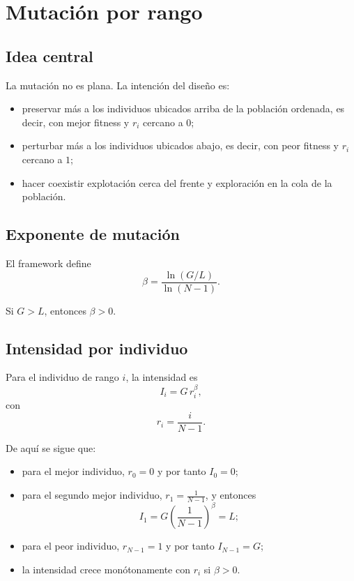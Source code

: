 \documentclass[11pt]{article}
\begin{document}
\section{Mutaci\'on por rango}

\subsection{Idea central}

La mutaci\'on no es plana. La intenci\'on del dise\~no es:

\begin{itemize}
  \item preservar m\'as a los individuos ubicados arriba de la poblaci\'on
  ordenada, es decir, con mejor fitness y \(r_i\) cercano a \(0\);
  \item perturbar m\'as a los individuos ubicados abajo, es decir, con peor
  fitness y \(r_i\) cercano a \(1\);
  \item hacer coexistir explotaci\'on cerca del frente y exploraci\'on en la
  cola de la poblaci\'on.
\end{itemize}

\subsection{Exponente de mutaci\'on}

El framework define
\[
\beta = \frac{\ln(G/L)}{\ln(N-1)}.
\]

Si \(G>L\), entonces \(\beta>0\).

\subsection{Intensidad por individuo}

Para el individuo de rango \(i\), la intensidad es
\[
I_i = G \, r_i^\beta,
\]
con
\[
r_i = \frac{i}{N-1}.
\]

De aqu\'i se sigue que:

\begin{itemize}
  \item para el mejor individuo, \(r_0=0\) y por tanto \(I_0=0\);
  \item para el segundo mejor individuo, \(r_1=\frac{1}{N-1}\), y entonces
  \[
  I_1 = G \left(\frac{1}{N-1}\right)^\beta = L;
  \]
  \item para el peor individuo, \(r_{N-1}=1\) y por tanto
  \(I_{N-1}=G\);
  \item la intensidad crece mon\'otonamente con \(r_i\) si \(\beta>0\).
\end{itemize}
\end{document}
